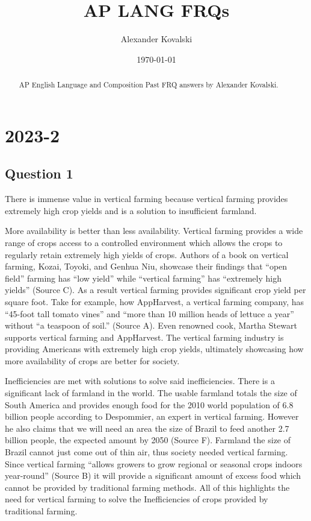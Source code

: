 \documentclass[10pt]{article}
\title{AP LANG FRQs}
\author{Alexander Kovalski}
\date{\today}
\begin{document}
\maketitle

\begin{abstract}

AP English Language and Composition Past FRQ answers by Alexander Kovalski.

\end{abstract}

\tableofcontents

\section{2023-2}

\subsection{Question 1}

There is immense value in vertical farming because vertical farming provides extremely high crop yields and is a solution to insufficient farmland.

More availability is better than less availability. Vertical farming provides a wide range of crops access to a controlled environment which allows the crops to regularly retain extremely high yields of crops. Authors of a book on vertical farming, Kozai, Toyoki, and Genhua Niu, showcase their findings that “open field” farming has “low yield” while “vertical farming” has “extremely high yields” (Source C). As a result vertical farming provides significant crop yield per square foot. Take for example, how AppHarvest, a vertical farming company, has “45-foot tall tomato vines” and “more than 10 million heads of lettuce a year” without “a teaspoon of soil.” (Source A). Even renowned cook, Martha Stewart supports vertical farming and AppHarvest. The vertical farming industry is providing Americans with extremely high crop yields, ultimately showcasing how more availability of crops are better for society.

Inefficiencies are met with solutions to solve said inefficiencies. There is a significant lack of farmland in the world. The usable farmland totals the size of South America and provides enough food for the 2010 world population of 6.8 billion people according to Despommier, an expert in vertical farming. However he also claims that we will need an area the size of Brazil to feed another 2.7 billion people, the expected amount by 2050 (Source F). Farmland the size of Brazil cannot just come out of thin air, thus society needed vertical farming. Since vertical farming “allows growers to grow regional or seasonal crops indoors year-round” (Source B) it will provide a significant amount of excess food which cannot be provided by traditional farming methods. All of this highlights the need for vertical farming to solve the Inefficiencies of crops provided by traditional farming.
\end{document}
